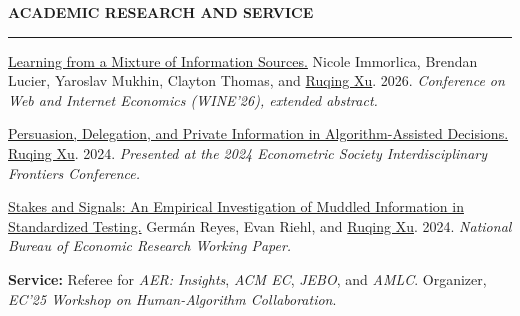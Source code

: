 \documentclass{resume} %
\def\sectionskip{\vspace{2pt}}
\def\sectionlineskip{\vspace{2pt}}
\renewenvironment{rSection}[1]{%
  \sectionskip
  \MakeUppercase{\bf #1}%
  \sectionlineskip
  \hrule
  \begin{list}{}{%
    \setlength{\leftmargin}{1.5em}%
    \setlength{\topsep}{3pt}%
    \setlength{\partopsep}{0pt}%
  }%
  \item[]
}{%
  \end{list}%
}
\begin{document}
\begin{rSection}{Academic Research and Service}

\href{https://arxiv.org/abs/2609.33214}{Learning from a Mixture of Information Sources.} Nicole Immorlica, Brendan Lucier, Yaroslav Mukhin, Clayton Thomas, and \underline{Ruqing Xu}. 2026.
\emph{Conference on Web and Internet Economics (WINE'26), extended abstract.}

\href{https://arxiv.org/abs/2402.09384}{Persuasion, Delegation, and Private Information in Algorithm-Assisted Decisions.} \underline{Ruqing Xu}. 2024. \emph{Presented at the 2024 Econometric Society Interdisciplinary Frontiers Conference.}

\href{https://www.nber.org/papers/w32608}{Stakes and Signals: An Empirical Investigation of Muddled
Information in Standardized Testing.} Germán Reyes, Evan Riehl, and \underline{Ruqing Xu}. 2024.
\emph{National Bureau of Economic Research Working Paper.}

{\bf Service:} Referee for \emph{AER: Insights}, \emph{ACM EC}, \emph{JEBO}, and \emph{AMLC}. Organizer, \emph{EC'25 Workshop on Human-Algorithm Collaboration}.
\end{rSection}











\end{document}
